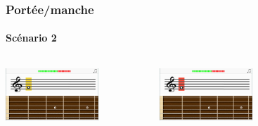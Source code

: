 \documentclass{beamer}
\begin{document}
	\begin{frame}

   		\frametitle{Portée/manche}

       		\framesubtitle{Scénario 2}

		\begin{columns}

			 \begin{column}{0.33\textwidth}

				\includegraphics[width=3.5cm]{images/portee_question.png}

			\end{column}

			 \begin{column}{0.33\textwidth}

				\includegraphics[width=3.5cm]{images/portee_mauvaise.png}

				
			\end{column}

			 \begin{column}{0.33\textwidth}

				
			\end{column}

		\end{columns} 

	\end{frame}
\end{document}
